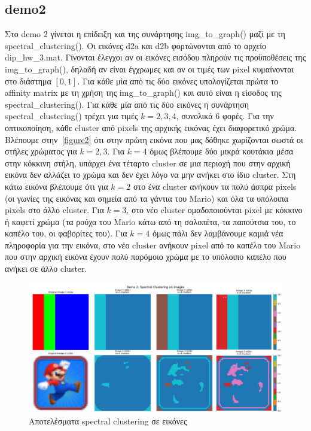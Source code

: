 \documentclass{article}
\begin{document}
\subsection{demo2}
Στο demo 2 γίνεται η επίδειξη και της συνάρτησης img\_to\_graph() μαζί με τη 
spectral\_clustering(). Οι εικόνες d2a και d2b φορτώνονται από το αρχείο 
dip\_hw\_3.mat. Γίνονται έλεγχοι αν οι εικόνες εισόδου πληρούν τις προϋποθέσεις 
της img\_to\_graph(), δηλαδή αν είναι έγχρωμες και αν οι τιμές των pixel κυμαίνονται 
στο διάστημα $[0,1]$. Για κάθε μία από τις δύο εικόνες υπολογίζεται πρώτα το
affinity matrix με τη χρήση της img\_to\_graph() και αυτό είναι η είσοδος
της spectral\_clustering(). Για κάθε μία από τις δύο εικόνες η συνάρτηση 
spectral\_clustering() τρέχει για τιμές $k = 2,3,4$, συνολικά 6 φορές. Για την
οπτικοποίηση, κάθε cluster από pixels της αρχικής εικόνας έχει διαφορετικό χρώμα. Βλέπουμε 
στην~\autoref{figure2} ότι στην πρώτη εικόνα που μας δόθηκε χωρίζονται σωστά 
οι στήλες χρώματος για $k=2,3$. Για $k=4$ όμως βλέπουμε δύο μικρά κουτάκια 
μέσα στην κόκκινη στήλη, υπάρχει ένα τέταρτο cluster σε μια περιοχή που
στην αρχική εικόνα δεν αλλάζει το χρώμα και δεν έχει λόγο να μην ανήκει στο 
ίδιο cluster. Στη κάτω εικόνα βλέπουμε ότι για $k=2$ στο ένα cluster ανήκουν
τα πολύ άσπρα pixels (οι γωνίες της εικόνας και σημεία από τα γάντια του Mario)
και όλα τα υπόλοιπα pixels στο άλλο cluster. Για $k=3$, στο νέο cluster 
ομαδοποιούνται pixel με κόκκινο ή καφετί χρώμα (τα ρούχα του Mario κάτω από
τη σαλοπέτα, τα παπούτσια του, το καπέλο του, οι φαβορίτες του). Για $k=4$ 
όμως πάλι δεν λαμβάνουμε καμιά νέα πληροφορία για την εικόνα, στο νέο 
cluster ανήκουν pixel από το καπέλο του Mario που στην αρχική εικόνα
έχουν πολύ παρόμοιο χρώμα με το υπόλοιπο καπέλο που ανήκει σε άλλο
cluster.

\begin{figure}
    \centering
    \includegraphics[width=\linewidth]{Figure_2.png}
    \caption{Αποτελέσματα spectral clustering σε εικόνες}\label{figure2}
\end{figure}
\end{document}
